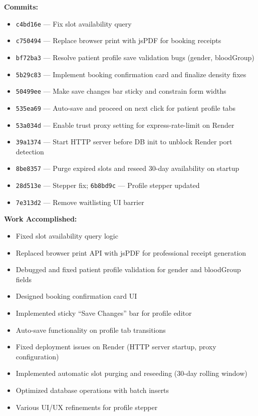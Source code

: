 \documentclass[11pt,a4paper]{article}
\begin{document}
\textbf{Commits:}
\begin{itemize}
  \item \texttt{c4bd16e} — Fix slot availability query
  \item \texttt{c750494} — Replace browser print with jsPDF for booking receipts
  \item \texttt{bf72ba3} — Resolve patient profile save validation bugs (gender, bloodGroup)
  \item \texttt{5b29c83} — Implement booking confirmation card and finalize density fixes
  \item \texttt{50499ee} — Make save changes bar sticky and constrain form widths
  \item \texttt{535ea69} — Auto-save and proceed on next click for patient profile tabs
  \item \texttt{53a034d} — Enable trust proxy setting for express-rate-limit on Render
  \item \texttt{39a1374} — Start HTTP server before DB init to unblock Render port detection
  \item \texttt{8be8357} — Purge expired slots and reseed 30-day availability on startup
  \item \texttt{28d513e} — Stepper fix; \texttt{6b8bd9c} — Profile stepper updated
  \item \texttt{7e313d2} — Remove waitlisting UI barrier
\end{itemize}

\textbf{Work Accomplished:}
\begin{itemize}
  \item Fixed slot availability query logic
  \item Replaced browser print API with jsPDF for professional receipt generation
  \item Debugged and fixed patient profile validation for gender and bloodGroup fields
  \item Designed booking confirmation card UI
  \item Implemented sticky ``Save Changes'' bar for profile editor
  \item Auto-save functionality on profile tab transitions
  \item Fixed deployment issues on Render (HTTP server startup, proxy configuration)
  \item Implemented automatic slot purging and reseeding (30-day rolling window)
  \item Optimized database operations with batch inserts
  \item Various UI/UX refinements for profile stepper
\end{itemize}
\end{document}
